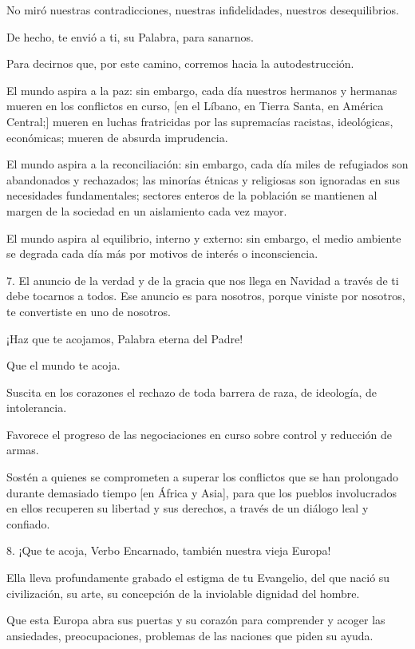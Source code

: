 \begin{body}
					No miró nuestras contradicciones, nuestras infidelidades, nuestros desequilibrios.
					
					De hecho, te envió a ti, su Palabra, para sanarnos.
					
					Para decirnos que, por este camino, corremos hacia la autodestrucción.
					
					El mundo aspira a la paz: sin embargo, cada día nuestros hermanos y hermanas mueren en los conflictos en curso, {[}en el Líbano, en Tierra Santa, en América Central;{]} mueren en luchas fratricidas por las supremacías racistas, ideológicas, económicas; mueren de absurda imprudencia.
					
					El mundo aspira a la reconciliación: sin embargo, cada día miles de refugiados son abandonados y rechazados; las minorías étnicas y religiosas son ignoradas en sus necesidades fundamentales; sectores enteros de la población se mantienen al margen de la sociedad en un aislamiento cada vez mayor.
					
					El mundo aspira al equilibrio, interno y externo: sin embargo, el medio ambiente se degrada cada día más por motivos de interés o inconsciencia.
					
					7. El anuncio de la verdad y de la gracia que nos llega en Navidad a través de ti debe tocarnos a todos. Ese anuncio es para nosotros, porque viniste por nosotros, te convertiste en uno de nosotros.
					
					¡Haz que te acojamos, Palabra eterna del Padre!
					
					Que el mundo te acoja.
					
					Suscita en los corazones el rechazo de toda barrera de raza, de ideología, de intolerancia.
					
					Favorece el progreso de las negociaciones en curso sobre control y reducción de armas.
					
					Sostén a quienes se comprometen a superar los conflictos que se han prolongado durante demasiado tiempo {[}en África y Asia{]}, para que los pueblos involucrados en ellos recuperen su libertad y sus derechos, a través de un diálogo leal y confiado.
					
					8. ¡Que te acoja, Verbo Encarnado, también nuestra vieja Europa!
					
					Ella lleva profundamente grabado el estigma de tu Evangelio, del que nació su civilización, su arte, su concepción de la inviolable dignidad del hombre.
					
					Que esta Europa abra sus puertas y su corazón para comprender y acoger las ansiedades, preocupaciones, problemas de las naciones que piden su ayuda.
					

\end{body}
